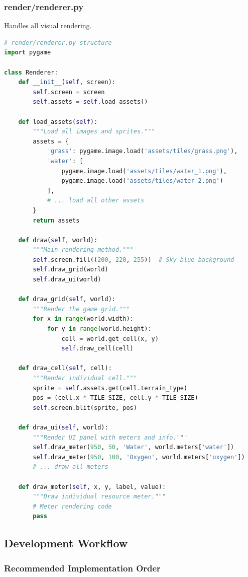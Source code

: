\documentclass[12pt,a4paper]{article}
\begin{document}
\subsubsection{render/renderer.py}

Handles all visual rendering.

\begin{lstlisting}[language=Python]
# render/renderer.py structure
import pygame

class Renderer:
    def __init__(self, screen):
        self.screen = screen
        self.assets = self.load_assets()
    
    def load_assets(self):
        """Load all images and sprites."""
        assets = {
            'grass': pygame.image.load('assets/tiles/grass.png'),
            'water': [
                pygame.image.load('assets/tiles/water_1.png'),
                pygame.image.load('assets/tiles/water_2.png')
            ],
            # ... load all other assets
        }
        return assets
    
    def draw(self, world):
        """Main rendering method."""
        self.screen.fill((200, 220, 255))  # Sky blue background
        self.draw_grid(world)
        self.draw_ui(world)
    
    def draw_grid(self, world):
        """Render the game grid."""
        for x in range(world.width):
            for y in range(world.height):
                cell = world.get_cell(x, y)
                self.draw_cell(cell)
    
    def draw_cell(self, cell):
        """Render individual cell."""
        sprite = self.assets.get(cell.terrain_type)
        pos = (cell.x * TILE_SIZE, cell.y * TILE_SIZE)
        self.screen.blit(sprite, pos)
    
    def draw_ui(self, world):
        """Render UI panel with meters and info."""
        self.draw_meter(950, 50, 'Water', world.meters['water'])
        self.draw_meter(950, 100, 'Oxygen', world.meters['oxygen'])
        # ... draw all meters
    
    def draw_meter(self, x, y, label, value):
        """Draw individual resource meter."""
        # Meter rendering code
        pass
\end{lstlisting}

\subsection{Development Workflow}

\subsubsection{Recommended Implementation Order}
\end{document}
